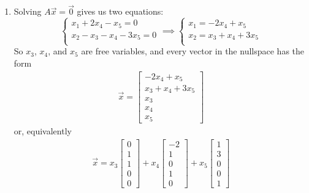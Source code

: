 \begin{Answer}[ref={nullspace1}]

\begin{enumerate}[label=\alph*]
    \item Solving $A\vec{x}=\vec{0}$ gives us two equations:
$$\begin{cases}
    x_1 + 2x_4 - x_5 =0 \\
    x_2 -x_3 -x_4 - 3x_5=0 \\
\end{cases} \implies \begin{cases}
    x_1 = -2x_4 + x_5 \\
    x_2 = x_3 + x_4 + 3x_5 \\
\end{cases}$$
So $x_3$, $x_4$, and $x_5$ are free variables, and every vector in the nullspace has the form
$$\begin{array}{c} \vec x=
\begin{bmatrix}
-2x_4+x_5\\
x_3+x_4+3x_5\\
x_3\\
x_4\\
x_5
\end{bmatrix} \end{array}$$
or, equivalently
$$\begin{array}{c} \vec x
=
x_3\begin{bmatrix}0\\1\\1\\0\\0\end{bmatrix}
+x_4\begin{bmatrix}-2\\1\\0\\1\\0\end{bmatrix}
+x_5\begin{bmatrix}1\\3\\0\\0\\1\end{bmatrix} \end{array}$$


\end{enumerate}
\end{Answer}
